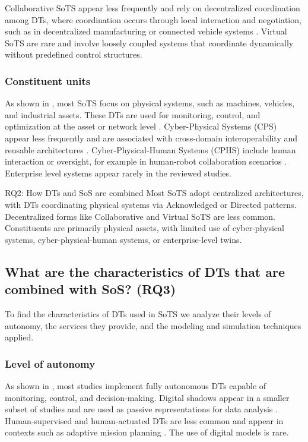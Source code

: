 Collaborative SoTS appear less frequently and rely on decentralized coordination among DTs, where coordination occurs through local interaction and negotiation, such as in decentralized manufacturing or connected vehicle systems \cite{vogel-heuser2021approach, chen2018digital}. Virtual SoTS are rare and involve loosely coupled systems that coordinate dynamically without predefined control structures.


\subsubsection{Constituent units}\label{sec:constituents}

As shown in , most SoTS focus on physical systems, such as machines, vehicles, and industrial assets. These DTs are used for monitoring, control, and optimization at the asset or network level \cite{reiche2021digital, kruger2022towards}. Cyber-Physical Systems (CPS) appear less frequently and are associated with cross-domain interoperability and reusable architectures \cite{marah2023architecture}. Cyber-Physical-Human Systems (CPHS) include human interaction or oversight, for example in human-robot collaboration scenarios \cite{savur2019hrc-sos}. Enterprise level systems appear rarely in the reviewed studies.

\begin{conclusionframe}{RQ2: How DTs and SoS are combined}
Most SoTS adopt centralized architectures, with DTs coordinating physical systems via Acknowledged or Directed patterns. Decentralized forms like Collaborative and Virtual SoTS are less common. Constituents are primarily physical assets, with limited use of cyber-physical systems, cyber-physical-human systems, or enterprise-level twins.
\end{conclusionframe}

\subsection{What are the characteristics of DTs that are combined with SoS? (RQ3)}\label{results-rq3}

To find the characteristics of DTs used in SoTS we analyze their levels of autonomy, the services they provide, and the modeling and simulation techniques applied.

\subsubsection{Level of autonomy}\label{sec:level-of-autonomy}

As shown in , most studies implement fully autonomous DTs capable of monitoring, control, and decision-making. Digital shadows appear in a smaller subset of studies and are used as passive representations for data analysis \cite{hofmeister2024semantic}. Human-supervised and human-actuated DTs are less common and appear in contexts such as adaptive mission planning \cite{folds2019digital}. The use of digital models is rare.


